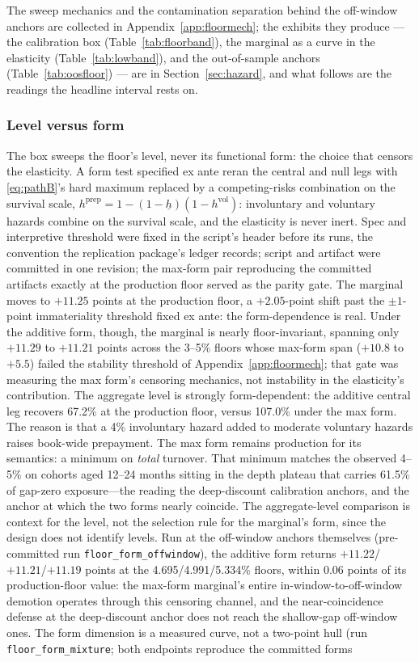 \documentclass[12pt]{article}
\begin{document}
The sweep mechanics and the contamination separation behind the off-window anchors are collected in Appendix~\ref{app:floormech}; the exhibits they produce --- the calibration box (Table~\ref{tab:floorband}), the marginal as a curve in the elasticity (Table~\ref{tab:lowband}), and the out-of-sample anchors (Table~\ref{tab:oosfloor}) --- are in Section~\ref{sec:hazard}, and what follows are the readings the headline interval rests on.

\subsubsection{Level versus form}

The box sweeps the floor's level, never its functional form: the choice that censors the elasticity. A form test specified ex ante reran the central and null legs with \eqref{eq:pathB}'s hard maximum replaced by a competing-risks combination on the survival scale, $h^{\mathrm{prep}} = 1 - (1 - \underline{h})(1 - h^{\mathrm{vol}})$: involuntary and voluntary hazards combine on the survival scale, and the elasticity is never inert. Spec and interpretive threshold were fixed in the script's header before its runs, the convention the replication package's ledger records; script and artifact were committed in one revision; the max-form pair reproducing the committed artifacts exactly at the production floor served as the parity gate. The marginal moves to $+11.25$ points at the production floor, a $+2.05$-point shift past the $\pm 1$-point immateriality threshold fixed ex ante: the form-dependence is real. Under the additive form, though, the marginal is nearly floor-invariant, spanning only $+11.29$ to $+11.21$ points across the 3--5\% floors whose max-form span ($+10.8$ to $+5.5$) failed the stability threshold of Appendix~\ref{app:floormech}; that gate was measuring the max form's censoring mechanics, not instability in the elasticity's contribution. The aggregate level is strongly form-dependent: the additive central leg recovers 67.2\% at the production floor, versus 107.0\% under the max form. The reason is that a 4\% involuntary hazard added to moderate voluntary hazards raises book-wide prepayment. The max form remains production for its semantics: a minimum on \emph{total} turnover. That minimum matches the observed 4--5\% on cohorts aged 12--24 months sitting in the depth plateau that carries 61.5\% of gap-zero exposure---the reading the deep-discount calibration anchors, and the anchor at which the two forms nearly coincide. The aggregate-level comparison is context for the level, not the selection rule for the marginal's form, since the design does not identify levels. Run at the off-window anchors themselves (pre-committed run \texttt{floor\_form\_offwindow}), the additive form returns $+11.22$/$+11.21$/$+11.19$ points at the 4.695/4.991/5.334\% floors, within 0.06 points of its production-floor value: the max-form marginal's entire in-window-to-off-window demotion operates through this censoring channel, and the near-coincidence defense at the deep-discount anchor does not reach the shallow-gap off-window ones. The form dimension is a measured curve, not a two-point hull (run \texttt{floor\_form\_mixture}; both endpoints reproduce the committed forms 
\end{document}
